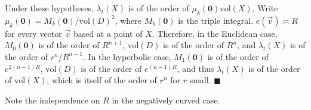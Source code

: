 \documentclass{article}
\newcommand{\vol}{\mathrm{vol}}
\newenvironment{proof}
{\noindent {\bf Proof.}}
{$\blacksquare$}
\begin{document}
\begin{proof}
Under these hypotheses, 
$\lambda_t(X)$ is of the order of $\mu_k(\textbf{0})\vol(X)$.
Write $\mu_k(\textbf{0})=M_k(\textbf{0})/\vol(D)^2$, where $M_k(\textbf{0})$ is the triple integral. 
$e(\vec{v})\asymp R$ for every vector $\vec{v}$ based at a point of $X$. 
Therefore, in the Euclidean case, $M_0(\textbf{0})$ is of the order of $R^{n+1}$,  
$\mathrm{vol}(D)$ is of the order of $R^n$, and $\lambda_t(X)$ is of the order of $r^n/R^{n-1}$. 
In the hyperbolic case, $M_1(\textbf{0})$ is of the order of $e^{2(n-1)R}$, 
$\vol(D)$ is of the order of $e^{(n-1)R}$, 
and thus $\lambda_t(X)$ is of the order of $\vol(X)$,  
which is itself of the order of $r^{n}$ for $r$ small. 
\end{proof}

Note the independence on $R$ in the negatively curved case.  
\end{document}
